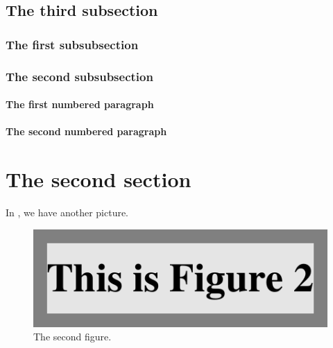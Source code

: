 \blah

\subsection{The third subsection}

\blah

\subsubsection{The first subsubsection}

\blah

\subsubsection{The second subsubsection}

\blah

\paragraph{The first numbered paragraph}

\blah

\paragraph{The second numbered paragraph}

\blah

\section{The second section}

\blah

\blah

\blah

\blah

In , we have another picture.

\blah

\begin{figure}[b]
    \centerline{\includegraphics{fig2}}
    \caption{The second figure.}%
\end{figure}

